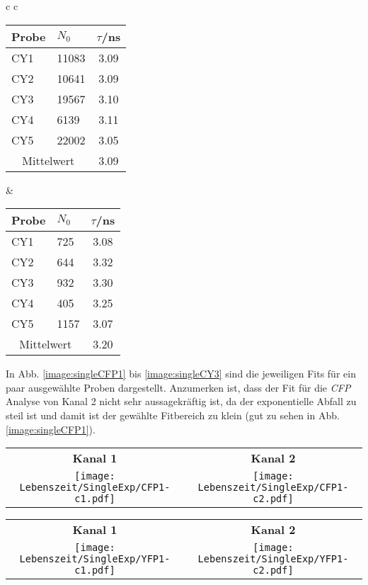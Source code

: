 \begin{center}
\begin{tabular}{c c}
        \begin{tabular}{l | l c}
            Probe & $N_0$ & $\tau$/ns\\
            \hline
            CY1  & 11083 & 3.09 \\
            CY2  & 10641 & 3.09 \\
            CY3  & 19567 & 3.10 \\
            CY4  & 6139  & 3.11 \\
            CY5  & 22002 & 3.05 \\
            \hline
            \multicolumn{2}{c}{Mittelwert} & 3.09 \\
        \end{tabular} & \hspace{1cm}
        \begin{tabular}{l | l c}
            Probe & $N_0$ & $\tau$/ns\\
            \hline
            CY1  & 725   & 3.08 \\
            CY2  & 644   & 3.32 \\
            CY3  & 932   & 3.30 \\
            CY4  & 405   & 3.25 \\
            CY5  & 1157  & 3.07 \\
            \hline
            \multicolumn{2}{c}{Mittelwert} & 3.20 \\
        \end{tabular}
    \end{tabular}
    \label{tab:lebenszeit}
\end{center}
In Abb. \ref{image:singleCFP1} bis \ref{image:singleCY3} sind die jeweiligen Fits für ein paar ausgewählte Proben dargestellt. Anzumerken ist, dass der Fit für die \textit{CFP} Analyse von Kanal 2 nicht sehr aussagekräftig ist, da der exponentielle Abfall zu steil ist und damit ist der gewählte Fitbereich zu klein (gut zu sehen in Abb. \ref{image:singleCFP1}).
\newpage
\begin{center}
    \begin{tabular}{c c}
        \textbf{Kanal 1} & \textbf{Kanal 2}\\
        \texttt{[image: Lebenszeit/SingleExp/CFP1-c1.pdf]}
        &
        \texttt{[image: Lebenszeit/SingleExp/CFP1-c2.pdf]}
    \end{tabular}
    \label{image:singleCFP1}
    \begin{tabular}{c c}
        \textbf{Kanal 1} & \textbf{Kanal 2}\\
        \texttt{[image: Lebenszeit/SingleExp/YFP1-c1.pdf]}
        &
        \texttt{[image: Lebenszeit/SingleExp/YFP1-c2.pdf]}
    \end{tabular}
    \label{image:singleYFP1}
\end{center}
